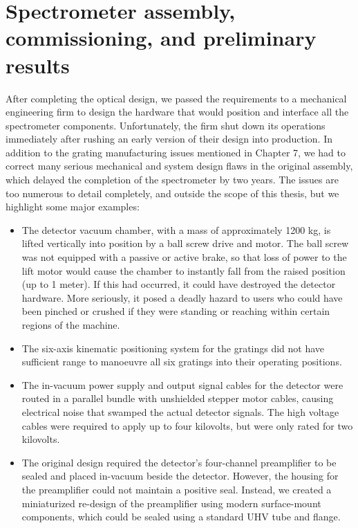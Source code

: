 \section{Spectrometer assembly, commissioning, and preliminary results}
After completing the optical design, we passed the requirements to a mechanical engineering firm to design the hardware that would position and interface all the spectrometer components.  Unfortunately, the firm shut down its operations immediately after rushing an early version of their design into production.  In addition to the grating manufacturing issues mentioned in Chapter 7, we had to correct many serious mechanical and system design flaws in the original assembly, which delayed the completion of the spectrometer by two years.  The issues are too numerous to detail completely, and outside the scope of this thesis, but we highlight some major examples:
\begin{itemize}
\item The detector vacuum chamber, with a mass of approximately 1200 kg, is lifted vertically into position by a ball screw drive and motor.  The ball screw was not equipped with a passive or active brake, so that loss of power to the lift motor would cause the chamber to instantly fall from the raised position (up to 1 meter).  If this had occurred, it could have destroyed the detector hardware.  More seriously, it posed a deadly hazard to users who could have been pinched or crushed if they were standing or reaching within certain regions of the machine.
\item The six-axis kinematic positioning system for the gratings did not have sufficient range to manoeuvre all six gratings into their operating positions.
\item The in-vacuum power supply and output signal cables for the detector were routed in a parallel bundle with unshielded stepper motor cables, causing electrical noise that swamped the actual detector signals.  The high voltage cables were required to apply up to four kilovolts, but were only rated for two kilovolts.
\item The original design required the detector's four-channel preamplifier to be sealed and placed in-vacuum beside the detector. However, the housing for the preamplifier could not maintain a positive seal.  Instead, we created a miniaturized re-design of the preamplifier using modern surface-mount components, which could be sealed using a standard UHV tube and flange.
\end{itemize}

